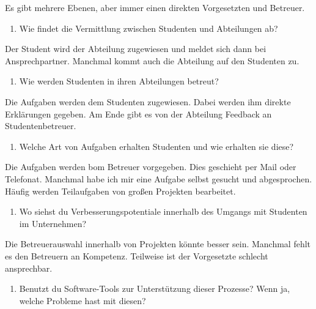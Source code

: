 \documentclass[
  12pt,
  ngerman,
  a4paper,
]{article}
\providecommand{\tightlist}{%
  \setlength{\itemsep}{0pt}\setlength{\parskip}{0pt}}
\begin{document}
Es gibt mehrere Ebenen, aber immer einen direkten Vorgesetzten und
Betreuer.

\begin{enumerate}
\def\labelenumi{\arabic{enumi}.}
\setcounter{enumi}{4}
\tightlist
\item
  Wie findet die Vermittlung zwischen Studenten und Abteilungen ab?
\end{enumerate}

Der Student wird der Abteilung zugewiesen und meldet sich dann bei
Ansprechpartner. Manchmal kommt auch die Abteilung auf den Studenten zu.

\begin{enumerate}
\def\labelenumi{\arabic{enumi}.}
\setcounter{enumi}{5}
\tightlist
\item
  Wie werden Studenten in ihren Abteilungen betreut?
\end{enumerate}

Die Aufgaben werden dem Studenten zugewiesen. Dabei werden ihm direkte
Erklärungen gegeben. Am Ende gibt es von der Abteilung Feedback an
Studentenbetreuer.

\begin{enumerate}
\def\labelenumi{\arabic{enumi}.}
\setcounter{enumi}{6}
\tightlist
\item
  Welche Art von Aufgaben erhalten Studenten und wie erhalten sie diese?
\end{enumerate}

Die Aufgaben werden bom Betreuer vorgegeben. Dies geschieht per Mail
oder Telefonat. Manchmal habe ich mir eine Aufgabe selbst gesucht und
abgesprochen. Häufig werden Teilaufgaben von großen Projekten
bearbeitet.

\begin{enumerate}
\def\labelenumi{\arabic{enumi}.}
\setcounter{enumi}{7}
\tightlist
\item
  Wo siehst du Verbesserungspotentiale innerhalb des Umgangs mit
  Studenten im Unternehmen?
\end{enumerate}

Die Betreuerauswahl innerhalb von Projekten könnte besser sein. Manchmal
fehlt es den Betreuern an Kompetenz. Teilweise ist der Vorgesetzte
schlecht ansprechbar.

\begin{enumerate}
\def\labelenumi{\arabic{enumi}.}
\setcounter{enumi}{8}
\tightlist
\item
  Benutzt du Software-Tools zur Unterstützung dieser Prozesse? Wenn ja,
  welche Probleme hast mit diesen?
\end{enumerate}
\end{document}
